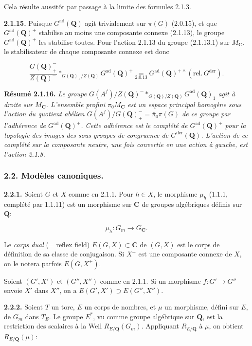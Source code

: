 \documentclass[10pt,a4paper]{article}
\begin{document}
Cela résulte aussitôt par passage à la limite des formules 2.1.3.

\textbf{2.1.15.} Puisque \(G^{\mathrm{ad}}(\mathbf Q)\) agit trivialement sur \(\pi(G)\) (2.0.15), et que \(G^{\mathrm{ad}}(\mathbf Q)^+\) stabilise au moins une composante connexe (2.1.13), le groupe \(G^{\mathrm{ad}}(\mathbf Q)^+\) les stabilise toutes. Pour l'action 2.1.13 du groupe (2.1.13.1) sur \(M_{\mathbf C}\), le stabilisateur de chaque composante connexe est donc

\[
\frac{G(\mathbf Q)_+^{-}}{Z(\mathbf Q)^{-}}*_{G(\mathbf Q)_+/Z(\mathbf Q)}G^{\mathrm{ad}}(\mathbf Q)^+
\underset{2.0.13}{=}G^{\mathrm{ad}}(\mathbf Q)^{+\wedge}(\mathrm{rel.}\,G^{\mathrm{der}}).
\tag{2.1.15.1}
\]

\textbf{Résumé 2.1.16.} \emph{Le groupe \(G(A^f)/Z(\mathbf Q)^{-}*_{G(\mathbf Q)/Z(\mathbf Q)}G^{\mathrm{ad}}(\mathbf Q)_1\) agit à droite sur \(M_{\mathbf C}\). L'ensemble profini \(\pi_0M_{\mathbf C}\) est un espace principal homogène sous l'action du quotient abélien \(G(A^f)/G(\mathbf Q)_+^{-}=\bar\pi_0\pi(G)\) de ce groupe par l'adhérence de \(G^{\mathrm{ad}}(\mathbf Q)^+\). Cette adhérence est le complété de \(G^{\mathrm{ad}}(\mathbf Q)^+\) pour la topologie des images des sous-groupes de congruence de \(G^{\mathrm{der}}(\mathbf Q)\). L'action de ce complété sur la composante neutre, une fois convertie en une action à gauche, est l'action 2.1.8.}

\subsubsection{2.2. Modèles canoniques.}

\textbf{2.2.1.} Soient \(G\) et \(X\) comme en 2.1.1. Pour \(h\in X\), le morphisme \(\mu_h\) (1.1.1, complété par 1.1.11) est un morphisme sur \(\mathbf C\) de groupes algébriques définis sur \(\mathbf Q\):

\[
\mu_h:G_m\to G_{\mathbf C}.
\]

Le \emph{corps dual} (= reflex field) \(E(G,X)\subset\mathbf C\) de \((G,X)\) est le corps de définition de sa classe de conjugaison. Si \(X^+\) est une composante connexe de \(X\), on le notera parfois \(E(G,X^+)\).

Soient \((G',X')\) et \((G'',X'')\) comme en 2.1.1. Si un morphisme \(f:G'\to G''\) envoie \(X'\) dans \(X''\), on a \(E(G',X')\supset E(G'',X'')\).

\textbf{2.2.2.} Soient \(T\) un tore, \(E\) un corps de nombres, et \(\mu\) un morphisme, défini sur \(E\), de \(G_m\) dans \(T_E\). Le groupe \(E^*\), vu comme groupe algébrique sur \(\mathbf Q\), est la restriction des scalaires à la Weil \(R_{E/\mathbf Q}(G_m)\). Appliquant \(R_{E/\mathbf Q}\) à \(\mu\), on obtient \(R_{E/\mathbf Q}(\mu)\):
\end{document}
